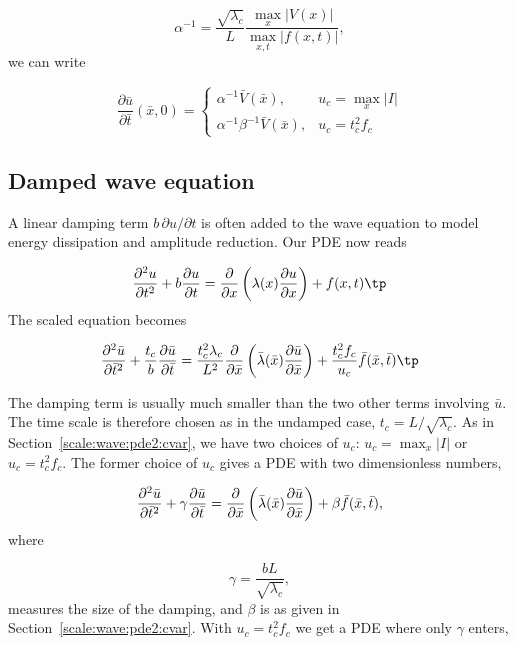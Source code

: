 \documentclass[graybox,envcountchap,sectrefs,final]{svmonodo}
\begin{document}
\[ \alpha^{-1} = \frac{\sqrt{\lambda_c}}{L}\frac{\max_{x}|V(x)|}{\max_{x,t}|f(x,t)|},
\]
we can write

\[
\frac{\partial\bar u}{\partial\bar t}(\bar x, 0) =
\left\lbrace \begin{array}{ll}
\alpha^{-1}\bar V(\bar x),& u_c=\max_x|I|\\ 
\alpha^{-1}\beta^{-1}\bar V(\bar x), & u_c=t_c^2f_c
\end{array}\right.
\]

\subsection{Damped wave equation}
\label{scale:wave:pde2:damped}

A linear damping term $b\,\partial u/\partial t$ is often added to
the wave equation to model energy dissipation and amplitude reduction.
Our PDE now reads

\begin{equation}
\frac{\partial^2 u}{\partial t^2}
+ b\frac{\partial u}{\partial t} =
\frac{\partial}{\partial x}\left(
\lambda(x) {\partial u\over\partial x}\right) + f(x,t)\tp
\end{equation}
The scaled equation becomes

\[
\frac{\partial^2 \bar u}{\partial \bar t^2}
+ \frac{t_c} b\frac{\partial \bar u}{\partial \bar t} =
\frac{t_c^2\lambda_c}{L^2}\frac{\partial}{\partial \bar x}\left(
\bar \lambda(\bar x) {\partial \bar u\over\partial \bar x}\right) +
\frac{t_c^2f_c}{u_c}\bar f(\bar x,\bar t)\tp
\]

The damping term is usually much smaller than the two other terms involving
$\bar u$. The time scale is therefore chosen as in the undamped case,
$t_c=L/\sqrt{\lambda_c}$. As in Section~\ref{scale:wave:pde2:cvar},
we have two choices of $u_c$: $u_c=\max_x|I|$ or $u_c=t_c^2f_c$.
The former choice of $u_c$ gives a PDE with two dimensionless numbers,

\begin{equation}
\frac{\partial^2 \bar u}{\partial \bar t^2}
+ \gamma\frac{\partial \bar u}{\partial \bar t} =
\frac{\partial}{\partial \bar x}\left(
\bar \lambda(\bar x) {\partial\bar u\over\partial\bar x}\right) +
\beta\bar f(\bar x,\bar t),
\end{equation}
where

\[ \gamma = \frac{bL}{\sqrt{\lambda_c}}, \]
measures the size of the damping, and $\beta$ is as given
in Section~\ref{scale:wave:pde2:cvar}.
With $u_c=t_c^2f_c$ we get a PDE where only $\gamma$ enters,
\end{document}
